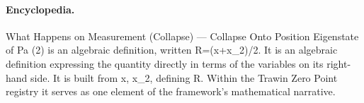 \paragraph{Encyclopedia.}
What Happens on Measurement (Collapse) — Collapse Onto Position Eigenstate of Pa (2) is an algebraic definition, written R=(x+x\_2)/2. It is an algebraic definition expressing the quantity directly in terms of the variables on its right-hand side. It is built from x, x\_2, defining R. Within the Trawin Zero Point registry it serves as one element of the framework's mathematical narrative.
